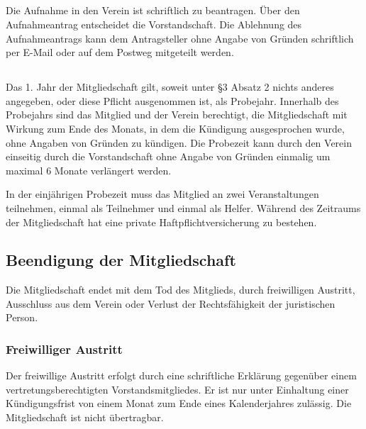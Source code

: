 \documentclass[10pt,a4paper]{article}
\begin{document}
\subsection{}
Die Aufnahme in den Verein ist schriftlich zu beantragen. Über den Aufnahmeantrag entscheidet die
Vorstandschaft. Die Ablehnung des Aufnahmeantrags kann dem Antragsteller ohne Angabe von Gründen
schriftlich per E-Mail oder auf dem Postweg mitgeteilt werden.
\subsection{}
Das 1. Jahr der Mitgliedschaft gilt, soweit unter §3 Absatz 2 nichts anderes angegeben, oder diese Pflicht
ausgenommen ist, als Probejahr. Innerhalb des Probejahrs sind das Mitglied und der Verein berechtigt, die
Mitgliedschaft mit Wirkung zum Ende des Monats, in dem die Kündigung ausgesprochen wurde, ohne Angaben
von Gründen zu kündigen. Die Probezeit kann durch den Verein einseitig durch die Vorstandschaft ohne Angabe
von Gründen einmalig um maximal 6 Monate verlängert werden.

In der einjährigen Probezeit muss das Mitglied an zwei Veranstaltungen teilnehmen, einmal als Teilnehmer und
einmal als Helfer. Während des Zeitraums der Mitgliedschaft hat eine private Haftpflichtversicherung zu
bestehen.
\subsection{Beendigung der Mitgliedschaft}
Die Mitgliedschaft endet mit dem Tod des Mitglieds, durch freiwilligen Austritt, Ausschluss aus dem Verein
oder Verlust der Rechtsfähigkeit der juristischen Person.
\subsubsection{Freiwilliger Austritt} Der freiwillige Austritt erfolgt durch eine schriftliche Erklärung gegenüber einem vertretungsberechtigten
Vorstandsmitgliedes. Er ist nur unter Einhaltung einer Kündigungsfrist von einem Monat zum Ende eines
Kalenderjahres zulässig. Die Mitgliedschaft ist nicht übertragbar.
\end{document}
